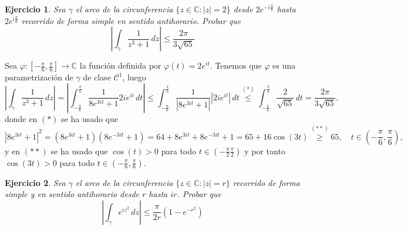 \documentclass[11pt]{report}
\makeatletter
\renewenvironment{proof}[1][\proofname]{\par
  \pushQED{\qed}%
  \normalfont \topsep\z@skip %
  \trivlist
  \item[\hskip\labelsep
        \itshape
    #1\@addpunct{.}]\ignorespaces
}{%
  \popQED\endtrivlist\@endpefalse
}
\newcommand{\C}{\mathbb C}
\newtheorem{exercise}{Ejercicio}
\makeatother
\begin{document}
\begin{exercise}
Sea $\gamma$ el arco de la circunferencia $\{z \in \C \colon |z| = 2\}$ desde $2e^{-i\frac{\pi}{6}}$ hasta $2e^{i\frac{\pi}{6}}$ recorrido de forma simple en sentido antihorario. Probar que
\[\left|\int_\gamma \frac{1}{z^3+1} \, dz\right| \leq \frac{2\pi}{3\sqrt{65}}\]
\end{exercise}

\begin{proof}
Sea $\varphi \colon [-\frac{\pi}{6},\frac{\pi}{6}] \to \C$ la función definida por $\varphi(t) = 2e^{it}$. Tenemos que $\varphi$ es una parametrización de $\gamma$ de clase $\mathcal{C}^1$, luego
\[
\left|\int_\gamma \frac{1}{z^3+1} \, dz\right| = \left|\int_{-\frac{\pi}{6}}^{\frac{\pi}{6}}\frac{1}{8e^{3it}+1}2ie^{it} \, dt\right| \leq \int_{-\frac{\pi}{6}}^{\frac{\pi}{6}}\frac{1}{|8e^{3it}+1|}|2ie^{it}| \, dt \overset{(*)}{\leq} \int_{-\frac{\pi}{6}}^{\frac{\pi}{6}}\frac{2}{\sqrt{65}} \, dt = \frac{2\pi}{3\sqrt{65}},
\]
donde en $(*)$ se ha usado que
\[|8e^{3it}+1|^2 = (8e^{3it}+1)(8e^{-3it}+1) = 64+8e^{3it}+8e^{-3it}+1 = 65+16\cos(3t) \overset{(**)}{\geq} 65, \quad t \in \left(-\frac{\pi}{6},\frac{\pi}{6}\right),\]
y en $(**)$ se ha usado que $\cos(t) >0$ para todo $t \in (-\frac{\pi}{2}\frac{\pi}{2})$ y por tanto $\cos(3t)>0$ para todo $t \in (-\frac{\pi}{6},\frac{\pi}{6})$.
\end{proof}

\begin{exercise}
Sea $\gamma$ el arco de la circunferencia $\{z \in \C \colon |z| = r\}$ recorrido de forma simple y en sentido antihorario desde $r$ hasta $ir$. Probar que
\[\left|\int_\gamma e^{iz^2} \, dz\right| \leq \frac{\pi}{2r}\left(1-e^{-r^2}\right)\]
\end{exercise}
\end{document}
